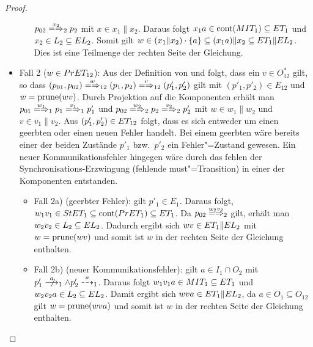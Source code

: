 \begin{proof}
\begin{itemize}
\begin{itemize}
        $p_{02}\weakmay[x_2]_2 p_2$ mit $x\in x_1\|x_2$. Daraus folgt $x_1a\in
        \mathrm{cont} (MIT _1) \subseteq ET _1$ und $x_2\in L_2\subseteq EL _2$.
        Somit gilt $w\in (x_1\|x_2) \cdot \{a\} \subseteq (x_1a)\|x_2\subseteq
        ET _1\|EL _2$. Dies ist eine Teilmenge der rechten Seite der Gleichung.
    \end{itemize}
  \item Fall 2 ($w\in PrET _{12}$): Aus der Definition von \PrET{} und \prune{}
    folgt, dass ein $v\in O_{12}^*$ gilt, so dass $(p_{01},p_{02})
      \weakmay[w]_{12} (p_1,p_2) \weakmay[v]_{12} (p'_1,p'_2)$ gilt mit
      $(p'_1,p'_2)\in E_{12}$ und $w=\mathrm{prune} (wv)$. Durch Projektion auf die
      Komponenten erhält man $p_{01} \weakmay[w_1]_1 p_1 \weakmay[v_1]_1 p'_1$
      und $p_{02} \weakmay[w_2]_2 p_2 \weakmay[v_2]_2 p'_2$ mit $w\in w_1\|w_2$
      und $v\in v_1\|v_2$. Aus $(p'_1,p'_2)\in ET _{12}$ folgt, dass es sich
      entweder um einen geerbten oder einen neuen Fehler handelt. Bei einem
      geerbten wäre bereits einer der beiden Zustände $p'_1$ bzw.\ $p'_2$ ein
      Fehler"=Zustand gewesen. Ein neuer Kommunikationsfehler hingegen wäre
      durch das fehlen der Synchronisations-Erzwingung (fehlende
      must"=Transition) in einer der Komponenten entstanden.
    \begin{itemize}
      \item Fall 2a) (geerbter Fehler): \OBdA{} gilt $p'_1\in E_1$. Daraus
        folgt, $w_1v_1\in StET_1 \subseteq \mathrm{cont} (PrET _1) \subseteq ET _1$.
        Da $p_{02} \weakmay[w_2v_2]_2$ gilt, erhält man $w_2v_2\in L_2\subseteq
        EL _2$. Dadurch ergibt sich $wv\in ET _1\|EL _2$ mit $w=\mathrm{prune} (wv)$
        und somit ist $w$ in der rechten Seite der Gleichung enthalten.
      \item Fall 2b) (neuer Kommunikationsfehler): \OBdA{} gilt $a\in I_1\cap
        O_2$ mit $p'_1\nmust[a]_1\land p'_2\may[a]_1$. Daraus folgt $w_1v_1a\in
        MIT _1 \subseteq ET _1$ und $w_2v_2a\in L_2 \subseteq EL _2$. Damit
        ergibt sich $wva\in ET _1\|EL_2$, da $a\in O_1\subseteq O_{12}$ gilt
        $w=\mathrm{prune} (wva)$ und somit ist $w$ in der rechten Seite der Gleichung
        enthalten.
    \end{itemize}
  \end{itemize}


\end{proof}
